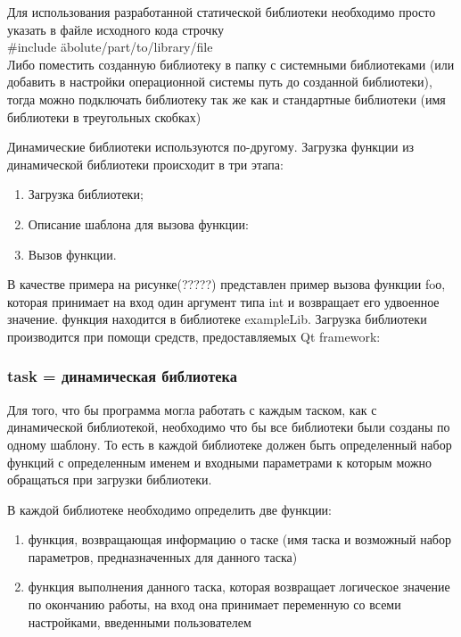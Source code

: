 Для использования разработанной статической библиотеки необходимо просто указать в файле исходного кода строчку \\
#include \"abolute/part/to/library/file\" \\
Либо поместить созданную библиотеку в папку с системными библиотеками (или добавить в настройки операционной системы путь до созданной библиотеки), тогда можно подключать библиотеку так же как и стандартные библиотеки (имя библиотеки в треугольных скобках)

Динамические библиотеки используются по-другому. Загрузка функции из динамической библиотеки происходит в три этапа: \\
\begin{enumerate}
\item Загрузка библиотеки;
\item Описание шаблона для вызова функции:
\item Вызов функции.
\end{enumerate}

В качестве примера на рисунке(?????) представлен пример вызова функции foо, которая принимает на вход один аргумент типа int и возвращает его удвоенное значение. функция находится в библиотеке exampleLib. Загрузка библиотеки производится при помощи средств, предоставляемых Qt framework: \\

\subsubsection{task = динамическая библиотека}

Для того, что бы программа могла работать с каждым таском, как с динамической библиотекой, необходимо что бы все библиотеки были созданы по одному шаблону. То есть в каждой библиотеке должен быть определенный набор функций с определенным именем и входными параметрами к которым можно обращаться при загрузки библиотеки. 

В каждой библиотеке необходимо определить две функции:
\begin{enumerate}
\item функция, возвращающая информацию о таске (имя таска и возможный набор параметров, предназначенных для данного таска)
\item функция выполнения данного таска, которая возвращает логическое значение по окончанию работы, на вход она принимает переменную со всеми настройками, введенными пользователем
\end{enumerate}

